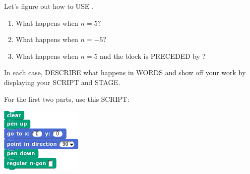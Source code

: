 \documentclass[noauthor,nooutcomes,12pt,handout]{ximera}
\begin{document}
\begin{question}
  Let's figure out how to USE
  .
  \begin{enumerate}
  \item What happens when $n=5?$
  \item What happens when $n=-5?$
  \item What happens when $n=5$ and the block is PRECEDED by
    ?
  \end{enumerate}
  In each case, DESCRIBE what happens in WORDS and show off your work
  by displaying your SCRIPT and STAGE.
  \begin{hint}
    For the first two parts, use this SCRIPT:
    \begin{center}
      \includegraphics{nGonBlockClearBlank.png}
    \end{center}
  \end{hint}
  

\end{question}
\end{document}
